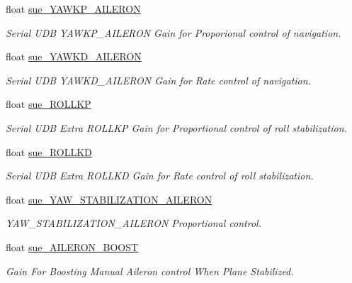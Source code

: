 \begin{DoxyCompactItemize}
\item 
float \hyperlink{struct____mavlink__serial__udb__extra__f5__t_a1f7b869f56f204b1ad40fad73c51de84}{sue\+\_\+\+Y\+A\+W\+K\+P\+\_\+\+A\+I\+L\+E\+R\+O\+N}
\begin{DoxyCompactList}\small\item\em Serial U\+D\+B Y\+A\+W\+K\+P\+\_\+\+A\+I\+L\+E\+R\+O\+N Gain for Proporional control of navigation. \end{DoxyCompactList}\item 
float \hyperlink{struct____mavlink__serial__udb__extra__f5__t_a1b4a059a78e93cf2b01f14e5ee1dacba}{sue\+\_\+\+Y\+A\+W\+K\+D\+\_\+\+A\+I\+L\+E\+R\+O\+N}
\begin{DoxyCompactList}\small\item\em Serial U\+D\+B Y\+A\+W\+K\+D\+\_\+\+A\+I\+L\+E\+R\+O\+N Gain for Rate control of navigation. \end{DoxyCompactList}\item 
float \hyperlink{struct____mavlink__serial__udb__extra__f5__t_a235be969e0669ab9b3ed33a7c2964dbd}{sue\+\_\+\+R\+O\+L\+L\+K\+P}
\begin{DoxyCompactList}\small\item\em Serial U\+D\+B Extra R\+O\+L\+L\+K\+P Gain for Proportional control of roll stabilization. \end{DoxyCompactList}\item 
float \hyperlink{struct____mavlink__serial__udb__extra__f5__t_a2ae37ffa5543b709c284f78ca2559ebb}{sue\+\_\+\+R\+O\+L\+L\+K\+D}
\begin{DoxyCompactList}\small\item\em Serial U\+D\+B Extra R\+O\+L\+L\+K\+D Gain for Rate control of roll stabilization. \end{DoxyCompactList}\item 
float \hyperlink{struct____mavlink__serial__udb__extra__f5__t_a070d88c384a1a99adb5a04e41ea6e485}{sue\+\_\+\+Y\+A\+W\+\_\+\+S\+T\+A\+B\+I\+L\+I\+Z\+A\+T\+I\+O\+N\+\_\+\+A\+I\+L\+E\+R\+O\+N}
\begin{DoxyCompactList}\small\item\em Y\+A\+W\+\_\+\+S\+T\+A\+B\+I\+L\+I\+Z\+A\+T\+I\+O\+N\+\_\+\+A\+I\+L\+E\+R\+O\+N Proportional control. \end{DoxyCompactList}\item 
float \hyperlink{struct____mavlink__serial__udb__extra__f5__t_a39ad32e19f708c41716f250df5e6febf}{sue\+\_\+\+A\+I\+L\+E\+R\+O\+N\+\_\+\+B\+O\+O\+S\+T}
\begin{DoxyCompactList}\small\item\em Gain For Boosting Manual Aileron control When Plane Stabilized. \end{DoxyCompactList}\end{DoxyCompactItemize}


